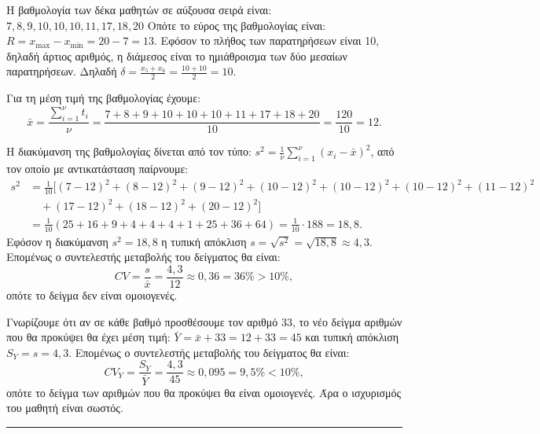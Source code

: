 \begin{alist}
\item Η βαθμολογία των δέκα μαθητών σε αύξουσα σειρά είναι:
$7, 8, 9, 10, 10, 10, 11, 17, 18, 20$
Οπότε το εύρος της βαθμολογίας είναι: $R = x_{\max} - x_{\min} = 20 - 7 = 13.$
Εφόσον το πλήθος των παρατηρήσεων είναι 10, δηλαδή άρτιος αριθμός, η διάμεσος είναι το ημιάθροισμα των δύο μεσαίων παρατηρήσεων.
Δηλαδή $\delta = \frac{x_5 + x_6}{2} = \frac{10+10}{2} = 10.$
\item Για τη μέση τιμή της βαθμολογίας έχουμε:
\[ \bar{x} = \frac{\sum_{i=1}^{\nu} t_i}{\nu} = \frac{7+8+9+10+10+10+11+17+18+20}{10} = \frac{120}{10} = 12. \]

\item Η διακύμανση της βαθμολογίας δίνεται από τον τύπο: $s^2 = \frac{1}{\nu} \sum_{i=1}^{\nu} (x_i - \bar{x})^2$, από τον οποίο με αντικατάσταση παίρνουμε:
\[ \begin{aligned} s^2 &= \frac{1}{10} [(7-12)^2 + (8-12)^2 + (9-12)^2 + (10-12)^2 + (10-12)^2 + (10-12)^2 + (11-12)^2 \\ & \quad + (17-12)^2 + (18-12)^2 + (20-12)^2] \\ &= \frac{1}{10} (25+16+9+4+4+4+1+25+36+64) = \frac{1}{10} \cdot 188 = 18,8. \end{aligned} \]
Εφόσον η διακύμανση $s^2 = 18,8$ η τυπική απόκλιση $s = \sqrt{s^2} = \sqrt{18,8} \approx 4,3.$
Επομένως ο συντελεστής μεταβολής του δείγματος θα είναι:
\[ CV = \frac{s}{\bar{x}} = \frac{4,3}{12} \approx 0,36 = 36\% > 10\%, \]
οπότε το δείγμα δεν είναι ομοιογενές.

\item Γνωρίζουμε ότι αν σε κάθε βαθμό προσθέσουμε τον αριθμό 33, το νέο δείγμα αριθμών που θα προκύψει θα έχει μέση τιμή: $\bar{Y} = \bar{x}+33 = 12+33=45$ και τυπική απόκλιση $S_Y = s = 4,3.$
Επομένως ο συντελεστής μεταβολής του δείγματος θα είναι:
\[ CV_Y = \frac{S_Y}{\bar{Y}} = \frac{4,3}{45} \approx 0,095 = 9,5\% < 10\%, \]
οπότε το δείγμα των αριθμών που θα προκύψει θα είναι ομοιογενές. Άρα ο ισχυρισμός του μαθητή είναι σωστός.
\end{alist}
\vspace{6mm}
\noindent\rule{\textwidth}{0.4pt}
\vspace{6mm}

